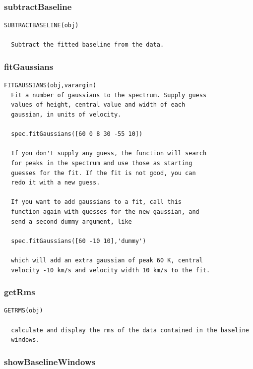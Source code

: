 \documentclass[11pt,a4paper]{article}
\begin{document}
\subsubsection*{subtractBaseline}
\label{sec:subtractbaseline}

\begin{lstlisting}[framerule=0pt]
  SUBTRACTBASELINE(obj)
  
  Subtract the fitted baseline from the data.
\end{lstlisting}


\subsubsection*{fitGaussians}
\label{sec:fitgaussians}

\begin{lstlisting}[framerule=0pt]
  FITGAUSSIANS(obj,varargin)    
  Fit a number of gaussians to the spectrum. Supply guess
  values of height, central value and width of each
  gaussian, in units of velocity.
  
  spec.fitGaussians([60 0 8 30 -55 10])                
                 
  If you don't supply any guess, the function will search
  for peaks in the spectrum and use those as starting
  guesses for the fit. If the fit is not good, you can
  redo it with a new guess.
 
  If you want to add gaussians to a fit, call this
  function again with guesses for the new gaussian, and
  send a second dummy argument, like
 
  spec.fitGaussians([60 -10 10],'dummy')
 
  which will add an extra gaussian of peak 60 K, central
  velocity -10 km/s and velocity width 10 km/s to the fit.
\end{lstlisting}


\subsubsection*{getRms}
\label{sec:getrms}

\begin{lstlisting}[framerule=0pt]
  GETRMS(obj)
  
  calculate and display the rms of the data contained in the baseline
  windows.
\end{lstlisting}


\subsubsection*{showBaselineWindows}
\label{sec:showbaselinewindows}
\end{document}
